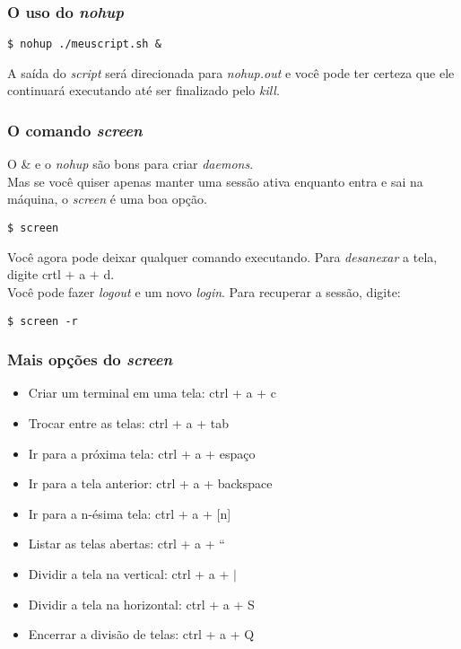 \documentclass{beamer}
\begin{document}
\begin{frame}[fragile]
   \frametitle{O uso do \textit{nohup}}
   \begin{verbatim}
$ nohup ./meuscript.sh &
   \end{verbatim} 
   A saída do \textit{script} será direcionada para \textit{nohup.out} e você pode ter certeza que ele continuará executando até ser finalizado pelo \textit{kill}.
\end{frame}

   \begin{frame}[fragile]
      \frametitle{O comando \textit{screen}}
      O \& e o \textit{nohup} são bons para criar \textit{daemons}.\\
      Mas se você quiser apenas manter uma sessão ativa enquanto entra e sai na máquina, o \textit{screen} é uma boa opção. 
      \begin{verbatim}
$ screen
      \end{verbatim}        
      Você agora pode deixar qualquer comando executando. Para \textit{desanexar} a tela, digite crtl $+$ a $+$ d. \\
      Você pode fazer \textit{logout} e um novo \textit{login}. Para recuperar a sessão, digite: 
      \begin{verbatim}
$ screen -r
      \end{verbatim} 
\end{frame}

   \begin{frame}
      \frametitle{Mais opções do \textit{screen}}
      \begin{itemize}
         \item Criar um terminal em uma tela: ctrl + a + c 
         \item Trocar entre as telas: ctrl + a + tab 
         \item Ir para a próxima tela: ctrl + a + espaço 
         \item Ir para a tela anterior: ctrl + a + backspace 
         \item Ir para a n-ésima tela: ctrl + a + [n] 
         \item Listar as telas abertas: ctrl + a + \textquotedblleft 
         \item Dividir a tela na vertical: ctrl + a + $|$ 
         \item Dividir a tela na horizontal: ctrl + a + S 
         \item Encerrar a divisão de telas: ctrl + a + Q 
      \end{itemize}
   \end{frame}
\end{document}
